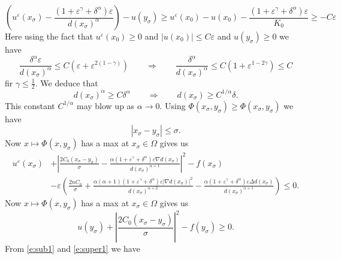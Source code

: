 \documentclass[10pt]{article}
\theoremstyle{plain}
\theoremstyle{remark}
\begin{document}
\begin{equation*}
    \left(u^\varepsilon(x_\sigma) - \frac{(1+\varepsilon^\gamma+\delta^\alpha)\varepsilon}{d(x_\sigma)^\alpha}\right)  - u(y_\sigma) \geq u^\varepsilon(x_0) - u(x_0) - \frac{(1+\varepsilon^\gamma+\delta^\alpha)\varepsilon}{K_0} \geq -C\varepsilon
\end{equation*}
Here using the fact that $u^\varepsilon(x_0)\geq 0$ and $|u(x_0)|\leq C\varepsilon$ and $u(y_\sigma) \geq 0$ we have
\begin{equation*}
    \frac{\delta^\alpha \varepsilon}{d(x_\sigma)^\alpha} \leq C\left(\varepsilon+\varepsilon^{2(1-\gamma)}\right) \qquad\Longrightarrow\qquad\frac{\delta^\alpha}{d(x_\sigma)^\alpha} \leq  C\left(1+\varepsilon^{1-2\gamma}\right) \leq C
\end{equation*}
fir $\gamma \leq \frac{1}{2}$. We deduce that
 \begin{equation*}
     d(x_\sigma)^\alpha \geq C\delta^\alpha \qquad\Longrightarrow\qquad d(x_\sigma) \geq C^{1/\alpha}\delta.
 \end{equation*}
This constant $C^{1/\alpha}$ may blow up as $\alpha\to 0$. Using $\Phi(x_\sigma,y_\sigma)\geq \Phi(x_\sigma,y_\sigma)$ we have
\begin{equation*}
    |x_\sigma - y_\sigma|\leq \sigma.
\end{equation*}
Now $x\mapsto \Phi(x,y_\sigma)$ has a max at $x_\sigma\in \Omega$ gives us
\begin{equation}\label{e:sub1}
\begin{split}
    u^\varepsilon(x_\sigma) &+ \left|\frac{2C_0(x_\sigma-y_\sigma)}{\sigma} - \frac{\alpha(1+\varepsilon^\gamma+\delta^\alpha)\varepsilon \nabla d(x_\sigma)}{d(x_\sigma)^{\alpha+1}}\right|^2 - f(x_\sigma) \\
    &-\varepsilon \left(\frac{2nC_0}{\sigma} + \frac{\alpha(\alpha+1)(1+\varepsilon^\gamma+\delta^\alpha)\varepsilon |\nabla d(x_\sigma)|^2}{d(x_\sigma)^{\alpha+2}} - \frac{\alpha(1+\varepsilon^\gamma + \delta^\alpha)\varepsilon\Delta d(x_\sigma)}{d(x_\sigma)^{\alpha+1}}\right) \leq 0.
\end{split}
\end{equation}
Now $x\mapsto \Phi(x,y_\sigma)$ has a max at $x_\sigma\in \Omega$ gives us
\begin{equation}\label{e:super1}
    u(y_\sigma) + \left|\frac{2C_0(x_\sigma-y_\sigma)}{\sigma}\right|^2  - f(y_\sigma)\geq 0.
\end{equation}
From \eqref{e:sub1} and \eqref{e:super1} we have
\end{document}
